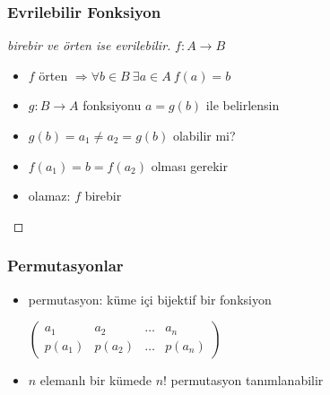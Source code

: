 \documentclass[dvipsnames]{beamer}
\theoremstyle{definition}
\theoremstyle{example}
\theoremstyle{plain}
\begin{document}
\begin{frame}
  \frametitle{Evrilebilir Fonksiyon}

  \begin{proof}[birebir ve örten ise evrilebilir]
    $f: A \rightarrow B$
    \begin{itemize}
      \item $f$ örten $\Rightarrow \forall b \in B~\exists a \in A~f(a)=b$
      \item $g: B \rightarrow A$ fonksiyonu $a=g(b)$ ile belirlensin

      \pause
      \medskip
      \item $g(b) = a_1 \neq a_2 = g(b)$ olabilir mi?

      \pause
      \item $f(a_1) = b = f(a_2)$ olması gerekir

      \pause
      \item olamaz: $f$ birebir
    \end{itemize}
  \end{proof}
\end{frame}

\begin{frame}
  \frametitle{Permutasyonlar}

  \begin{itemize}
    \item permutasyon: küme içi bijektif bir fonksiyon

    \medskip
    $\left(
      \begin{array}{cccc}
       a_1   &  a_2   & \dots &  a_n\\
      p(a_1) & p(a_2) & \dots & p(a_n)
      \end{array}
    \right)$

    \pause
    \medskip
    \item $n$ elemanlı bir kümede $n!$ permutasyon tanımlanabilir
  \end{itemize}
\end{frame}
\end{document}
